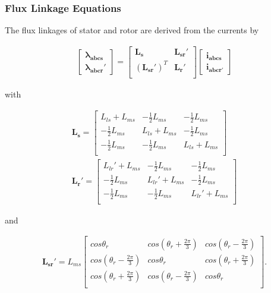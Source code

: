 \begin{flushleft}
\subsubsection{Flux Linkage Equations}
The flux linkages of stator and rotor are derived from the currents by

\begin{align*}
\begin{bmatrix}
\mathbf{\lambda_{abcs}} \\
\mathbf{\lambda_{abcr}'}
\end{bmatrix}
=
\begin{bmatrix}
\mathbf{L_s} & \mathbf{L_{sr}'} \\
(\mathbf{L_{sr}'})^T & \mathbf{L_r'} \\
\end{bmatrix}
\begin{bmatrix}
\mathbf{i_{abcs}} \\
\mathbf{i_{abcr'}}
\end{bmatrix}
\end{align*}

with 

\begin{align*}
\mathbf{L_s} =
\begin{bmatrix}
L_{ls} + L_{ms} & -\frac{1}{2}L_{ms} & -\frac{1}{2}L_{ms} \\
-\frac{1}{2}L_{ms} & L_{ls} + L_{ms} & -\frac{1}{2}L_{ms} \\
-\frac{1}{2}L_{ms} & -\frac{1}{2}L_{ms} & L_{ls} + L_{ms} \\
\end{bmatrix} \\
\mathbf{L_r}' =
\begin{bmatrix}
L_{lr}' + L_{ms} & -\frac{1}{2}L_{ms} & -\frac{1}{2}L_{ms} \\
-\frac{1}{2}L_{ms} & L_{lr}' + L_{ms} & -\frac{1}{2}L_{ms} \\
-\frac{1}{2}L_{ms} & -\frac{1}{2}L_{ms} & L_{lr}' + L_{ms} \\
\end{bmatrix}
\end{align*}

and

\begin{align*}
\mathbf{L_{sr}}' = L_{ms}
\begin{bmatrix}
cos \theta_r & cos(\theta_r+\frac{2\pi}{3}) & cos(\theta_r-\frac{2\pi}{3}) \\
cos(\theta_r-\frac{2\pi}{3}) & cos \theta_r & cos(\theta_r+\frac{2\pi}{3}) \\
cos(\theta_r+\frac{2\pi}{3}) & cos(\theta_r-\frac{2\pi}{3}) & cos \theta_r \\
\end{bmatrix}.
\end{align*}


\end{flushleft}
